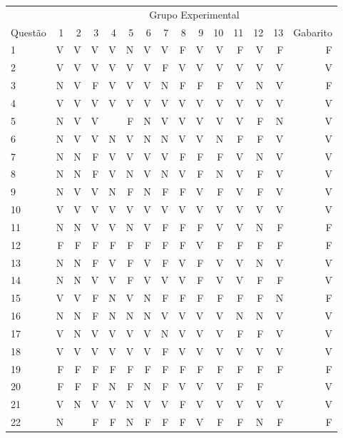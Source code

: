 \begin{apendicesenv}
\begin{center}
	\begin{tabular}{ l r r r r r r r r r r r r r r}
	\hline
	& \multicolumn{14}{c}{Grupo Experimental}\\
	\cline{2 - 14} %
	\multirow[c]{-2}{*}{Questão} & 1 & 2 & 3 & 4 & 5 & 6 & 7 & 8 & 9 & 10 & 11 & 12 & 13 & Gabarito\\
	\hline
	1	&	V	&	V	&	V	&	V	&	N	&	V	&	V	&	F	&	V	&	V	&	F	&	V	&	F	&	F	\\
	2	&	V	&	V	&	V	&	V	&	V	&	V	&	F	&	V	&	V	&	V	&	V	&	V	&	V	&	V	\\
	3	&	N	&	V	&	F	&	V	&	V	&	V	&	N	&	F	&	F	&	F	&	V	&	N	&	V	&	F	\\
	4	&	V	&	V	&	V	&	V	&	V	&	V	&	V	&	V	&	V	&	V	&	V	&	V	&	V	&	V	\\
	5	&	N	&	V	&	V	&		&	F	&	N	&	V	&	V	&	V	&	V	&	V	&	F	&	N	&	V	\\
	6	&	N	&	V	&	V	&	N	&	V	&	N	&	N	&	V	&	V	&	N	&	F	&	F	&	V	&	V	\\
	7	&	N	&	N	&	F	&	V	&	V	&	V	&	V	&	F	&	F	&	F	&	V	&	N	&	V	&	V	\\
	8	&	N	&	N	&	F	&	V	&	N	&	V	&	N	&	V	&	F	&	N	&	V	&	F	&	V	&	V	\\
	9	&	N	&	V	&	V	&	N	&	F	&	N	&	F	&	F	&	V	&	F	&	V	&	F	&	V	&	V	\\
	10	&	V	&	V	&	V	&	V	&	V	&	V	&	V	&	V	&	V	&	V	&	V	&	V	&	V	&	V	\\
	11	&	N	&	N	&	V	&	V	&	N	&	V	&	F	&	F	&	F	&	V	&	V	&	N	&	F	&	F	\\
	12	&	F	&	F	&	F	&	F	&	F	&	F	&	F	&	F	&	V	&	F	&	F	&	F	&	F	&	F	\\
	13	&	N	&	N	&	F	&	V	&	F	&	V	&	F	&	V	&	F	&	V	&	V	&	N	&	V	&	V	\\
	14	&	N	&	N	&	V	&	V	&	F	&	V	&	V	&	V	&	F	&	V	&	V	&	F	&	F	&	V	\\
	15	&	V	&	V	&	F	&	N	&	V	&	N	&	F	&	F	&	F	&	F	&	F	&	F	&	N	&	F	\\
	16	&	N	&	N	&	F	&	N	&	N	&	N	&	V	&	V	&	V	&	V	&	N	&	N	&	V	&	V	\\
	17	&	V	&	N	&	V	&	V	&	V	&	V	&	N	&	V	&	V	&	V	&	F	&	F	&	V	&	V	\\
	18	&	V	&	V	&	V	&	V	&	V	&	V	&	F	&	V	&	V	&	V	&	V	&	V	&	V	&	V	\\
	19	&	F	&	F	&	F	&	F	&	F	&	F	&	F	&	F	&	F	&	F	&	F	&	F	&	F	&	F	\\
	20	&	F	&	F	&	F	&	N	&	F	&	N	&	F	&	V	&	V	&	V	&	F	&	F	&		&	V	\\
	21	&	V	&	N	&	V	&	V	&	N	&	V	&	V	&	F	&	V	&	V	&	V	&	V	&	V	&	V	\\
	22	&	N	&		&	F	&	F	&	N	&	F	&	F	&	F	&	V	&	F	&	F	&	N	&	F	&	F	\\

\end{tabular}
\end{center}
\end{apendicesenv}
